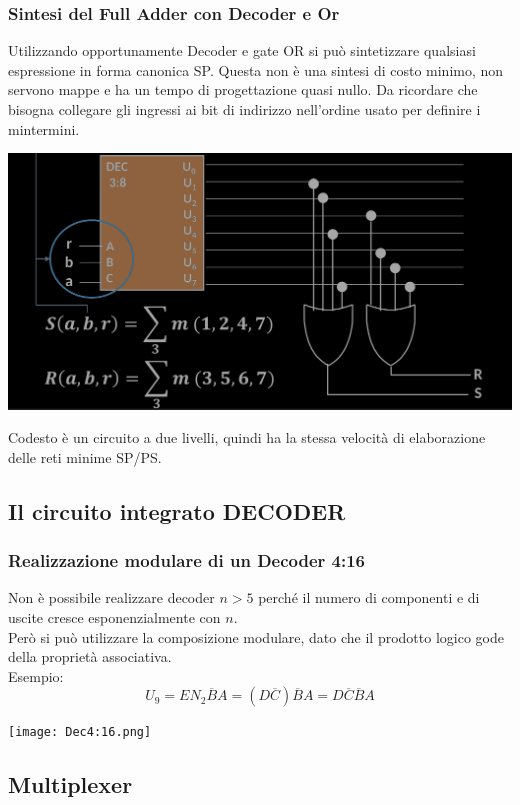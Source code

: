 \documentclass{article}
\begin{document}
\subsubsection{Sintesi del Full Adder con Decoder e Or}
Utilizzando opportunamente Decoder e gate OR si può sintetizzare qualsiasi espressione in forma canonica SP. Questa non è una sintesi di costo minimo, non servono mappe e ha un tempo di progettazione quasi nullo. Da ricordare che bisogna collegare gli ingressi ai bit di indirizzo nell’ordine usato per definire i mintermini.
\begin{center}
    \includegraphics[scale=0.55]{sintesiFullAdder.png}
\end{center}
Codesto è un circuito a due livelli, quindi ha la stessa velocità di elaborazione delle reti minime SP/PS.
\subsection{Il circuito integrato DECODER}
\subsubsection{Realizzazione modulare di un Decoder 4:16}
Non è possibile realizzare decoder $n>5$ perché il numero di componenti e di uscite cresce esponenzialmente con $n$.\\
Però si può utilizzare la composizione modulare, dato che il prodotto logico gode della proprietà associativa.
\vspace{0.2cm}\\
Esempio:
$$ U_9 = EN_2 \overline{B} A = (D \overline{C}) \overline{B} A = D \overline{C} \overline{B} A $$
\begin{center}
    \texttt{[image: Dec4:16.png]}
\end{center}
\subsection{Multiplexer}
\end{document}

